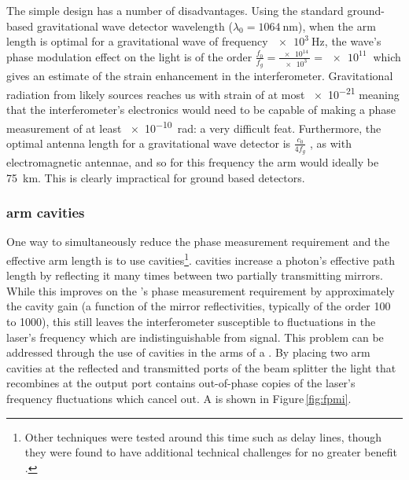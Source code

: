 The simple \MI{} design has a number of disadvantages. Using the standard ground-based gravitational wave detector wavelength ($\lambda_0 = \SI{1064}{\nano\meter}$), when the arm length is optimal for a gravitational wave of frequency $\SI{e3}{\hertz}$, the wave's phase modulation effect on the light is of the order $\frac{f_0}{f_g} = \frac{\SI{e14}{}}{\SI{e3}{}} = \SI{e11}{}$ which gives an estimate of the strain enhancement in the interferometer. Gravitational radiation from likely sources reaches us with strain of at most \SI{e-21}{} meaning that the interferometer's electronics would need to be capable of making a phase measurement of at least \SI{e-10}{\radian}: a very difficult feat. Furthermore, the optimal antenna length for a gravitational wave detector is $\frac{c_0}{4 f_g}$ \cite{Abbott2016a}, as with electromagnetic antennae, and so for this frequency the arm would ideally be \SI{75}{\kilo\meter}. This is clearly impractical for ground based detectors.

\subsubsection{\label{sec:fabry-perot-cavities}\FP{} arm cavities}
One way to simultaneously reduce the phase measurement requirement and the effective arm length is to use \FP{} cavities\footnote{Other techniques were tested around this time such as delay lines, though they were found to have additional technical challenges for no greater benefit .}. \FP{} cavities increase a photon's effective path length by reflecting it many times between two partially transmitting mirrors. While this improves on the \MI{}'s phase measurement requirement by approximately the cavity gain (a function of the mirror reflectivities, typically of the order \num{100} to \num{1000}), this still leaves the interferometer susceptible to fluctuations in the laser's frequency which are indistinguishable from signal. This problem can be addressed through the use of \FP{} cavities in the arms of a \MI{}. By placing two arm cavities at the reflected and transmitted ports of the beam splitter the light that recombines at the output port contains out-of-phase copies of the laser's frequency fluctuations which cancel out. A \emph{\FPMI{}} is shown in Figure\,\ref{fig:fpmi}.

